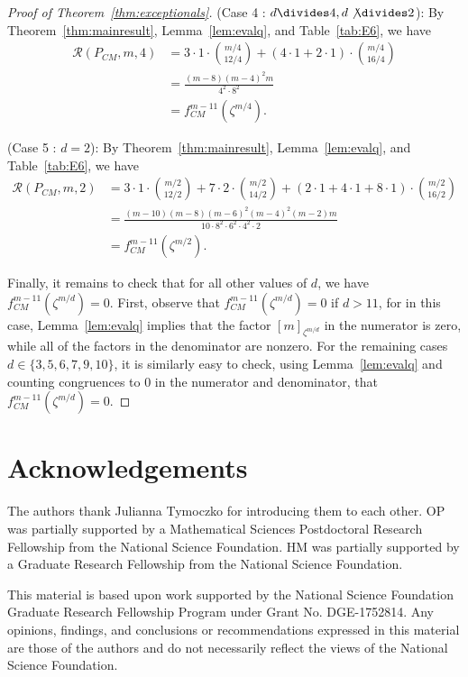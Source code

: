 \documentclass[12pt]{amsart}
\theoremstyle{definition}
\theoremstyle{remark}
\numberwithin{equation}{section}
\begin{document}
\begin{proof}[Proof of Theorem~\ref{thm:exceptionals}]
\smallskip
\noindent
{\sf (Case 4 : $d \divides 4, d \not \divides 2$)}:
By Theorem~\ref{thm:mainresult}, Lemma~\ref{lem:evalq}, and Table~\ref{tab:E6}, we have
\begin{align*}
\mathcal{R}(P_{CM},m,4) &= 3 \cdot 1 \cdot \binom{m/4}{12/4} + (4 \cdot 1 + 2 \cdot 1) \cdot \binom{m/4}{16/4}  \\
&= \frac{(m-8)(m-4)^2m}{4^2 \cdot 8^2} \\
&= f_{CM}^{m-11}(\zeta^{m/4}).
\end{align*}

\smallskip
\noindent
{\sf (Case 5 : $d = 2$)}:
By Theorem~\ref{thm:mainresult}, Lemma~\ref{lem:evalq}, and Table~\ref{tab:E6}, we have
\begin{align*}
\mathcal{R}(P_{CM},m,2) &= 3 \cdot 1 \cdot \binom{m/2}{12/2} + 7 \cdot 2 \cdot \binom{m/2}{14/2} + (2 \cdot 1 + 4 \cdot 1 + 8 \cdot 1) \cdot \binom{m/2}{16/2} \\
&= \frac{(m-10)(m-8)(m-6)^2(m-4)^2(m-2)m}{10 \cdot 8^2 \cdot 6^2 \cdot  4^2 \cdot 2}\\
&= f_{CM}^{m-11}(\zeta^{m/2}).
\end{align*}

Finally, it remains to check that for all other values of $d$, we have $f^{m-11}_{CM}(\zeta^{m/d}) = 0$.  First, observe that $f^{m-11}_{CM}(\zeta^{m/d}) = 0$ if $d > 11$, for in this case, Lemma~\ref{lem:evalq} implies that the factor $[m]_{\zeta^{m/d}}$ in the numerator is zero, while all of the factors in the denominator are nonzero. 
For the remaining cases $d \in \{3,5,6,7,9,10 \}$, it is similarly easy to check, using Lemma~\ref{lem:evalq} and counting congruences to $0$ in the numerator and denominator, that $f^{m-11}_{CM}(\zeta^{m/d}) = 0$. 
\end{proof}

\section*{Acknowledgements}
The authors thank Julianna Tymoczko for introducing them to each other. OP was partially supported by a Mathematical Sciences Postdoctoral Research Fellowship from the National Science Foundation. HM was partially supported by a Graduate Research Fellowship from the National Science Foundation.

This material is based upon work supported by the National Science Foundation Graduate Research Fellowship Program under Grant No. DGE-1752814. Any opinions, findings, and conclusions or recommendations expressed in this material are those of the authors and do not necessarily reflect the views of the National Science Foundation.


%
%


 

\end{document}
